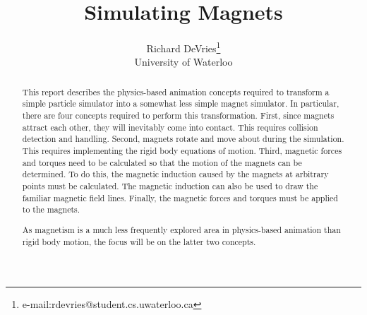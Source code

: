 \documentclass[tog]{acmsiggraph}
\title{Simulating Magnets}
\author{Richard DeVries\thanks{e-mail:rdevries@student.cs.uwaterloo.ca}\\University of Waterloo}
\begin{document}



\maketitle


\begin{abstract}

This report describes the physics-based animation concepts required to transform a simple particle simulator into a somewhat less simple magnet simulator. In particular, there are four concepts required to perform this transformation. First, since magnets attract each other, they will inevitably come into contact. This requires collision detection and handling. Second, magnets rotate and move about during the simulation. This requires implementing the rigid body equations of motion. Third, magnetic forces and torques need to be calculated so that the motion of the magnets can be determined. To do this, the magnetic induction caused by the magnets at arbitrary points must be calculated. The magnetic induction can also be used to draw the familiar magnetic field lines. Finally, the magnetic forces and torques must be applied to the magnets.

As magnetism is a much less frequently explored area in physics-based animation than rigid body motion, the focus will be on the latter two concepts.


\end{abstract}
\end{document}
